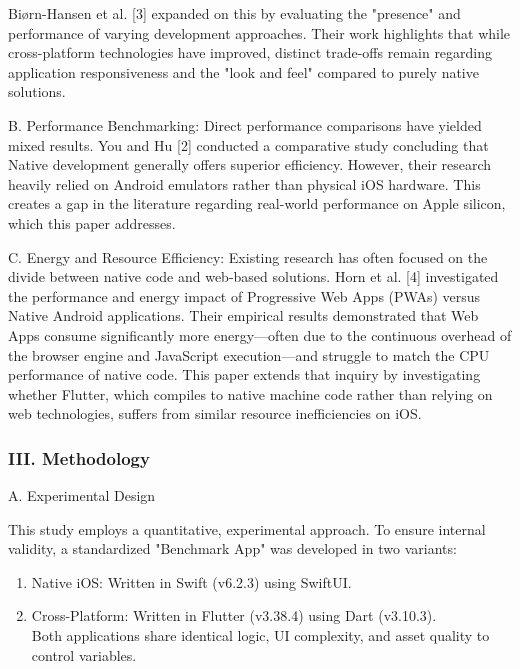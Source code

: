 \documentclass[
]{article}
\begin{document}
Biørn-Hansen et al. {[}3{]} expanded on this by evaluating the
"presence" and performance of varying development approaches. Their work
highlights that while cross-platform technologies have improved,
distinct trade-offs remain regarding application responsiveness and the
"look and feel" compared to purely native solutions.

B. Performance Benchmarking: Direct performance comparisons have yielded
mixed results. You and Hu {[}2{]} conducted a comparative study
concluding that Native development generally offers superior efficiency.
However, their research heavily relied on Android emulators rather than
physical iOS hardware. This creates a gap in the literature regarding
real-world performance on Apple silicon, which this paper addresses.

C. Energy and Resource Efficiency: Existing research has often focused
on the divide between native code and web-based solutions. Horn et al.
{[}4{]} investigated the performance and energy impact of Progressive
Web Apps (PWAs) versus Native Android applications. Their empirical
results demonstrated that Web Apps consume significantly more
energy---often due to the continuous overhead of the browser engine and
JavaScript execution---and struggle to match the CPU performance of
native code. This paper extends that inquiry by investigating whether
Flutter, which compiles to native machine code rather than relying on
web technologies, suffers from similar resource inefficiencies on iOS.

\subsubsection{\texorpdfstring{\textbf{III.
Methodology}}{III. Methodology}}\label{iii.-methodology}

A. Experimental Design

This study employs a quantitative, experimental approach. To ensure
internal validity, a standardized "Benchmark App" was developed in two
variants:

\begin{enumerate}
\def\labelenumi{\arabic{enumi}.}
\item
  Native iOS: Written in Swift (v6.2.3) using SwiftUI.
\item
  Cross-Platform: Written in Flutter (v3.38.4) using Dart (v3.10.3).\\
  Both applications share identical logic, UI complexity, and asset
  quality to control variables.
\end{enumerate}
\end{document}
